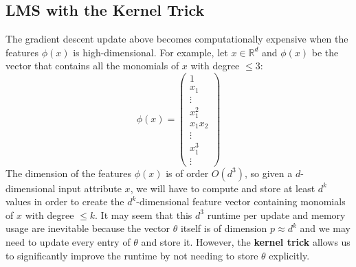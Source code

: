 \documentclass[a4paper, 12pt]{report}
\theoremstyle{remark}
\theoremstyle{definition}
\begin{document}
\subsection{LMS with the Kernel Trick}
The gradient descent update above becomes computationally expensive when the features $\phi(x)$ is high-dimensional. For example, let $x \in \mathbb{R}^d$ and $\phi(x)$ be the vector that contains all the monomials of $x$ with degree $\leq 3$: 
\[\phi(x) = \begin{pmatrix}
1 \\ x_1 \\ \vdots \\ x_1^2 \\ x_1 x_2 \\ \vdots \\ x_1^3 \\ \vdots
\end{pmatrix}\]
The dimension of the features $\phi(x)$ is of order $O(d^3)$, so given a $d$-dimensional input attribute $x$, we will have to compute and store at least $d^k$ values in order to create the $d^k$-dimensional feature vector containing monomials of $x$ with degree $\leq k$. It may seem that this $d^3$ runtime per update and memory usage are inevitable because the vector $\theta$ itself is of dimension $p \approx d^k$ and we may need to update every entry of $\theta$ and store it. However, the \textbf{kernel trick} allows us to significantly improve the runtime by not needing to store $\theta$ explicitly. 
\end{document}
